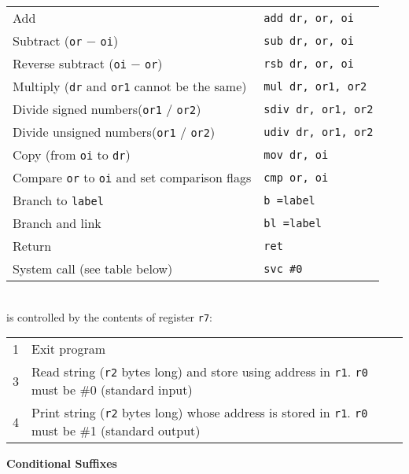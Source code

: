 \documentclass{article}
\begin{document}
\begin{tabular}{ll}
Add & {\tt add dr, or, oi} \\
Subtract ({\tt or} $-$ {\tt oi}) & {\tt sub dr, or, oi} \\
Reverse subtract ({\tt oi} $-$ {\tt or}) & {\tt rsb dr, or, oi} \\
Multiply ({\tt dr} and {\tt or1} cannot be the same) & {\tt mul dr, or1, or2} \\
Divide signed numbers\footnotemark ({\tt or1} $/$ {\tt or2}) & {\tt sdiv dr, or1, or2} \\
Divide unsigned numbers\footnotemark[1] ({\tt or1} $/$ {\tt or2}) & {\tt udiv dr, or1, or2} \\
Copy (from {\tt oi} to {\tt dr}) & {\tt mov dr, oi} \\
Compare {\tt or} to {\tt oi} and set comparison flags \hspace{2em} & {\tt cmp or, oi} \\
Branch to {\tt label} & {\tt b =label} \\
Branch and link & {\tt bl =label} \\
Return & {\tt ret} \\
System call (see table below) & {\tt svc \#0} \\
\end{tabular} \\
\hspace*{6em}{\tt svc \#0} is controlled by the contents of register {\tt r7}: \\
\hspace*{6em}\begin{tabular}{ll}
1 & Exit program \\
3 & Read string ({\tt r2} bytes long) and store using address in {\tt r1}.
  {\tt r0} must be \#0 (standard input) \\
4 & Print string ({\tt r2} bytes long) whose address is stored in {\tt r1}.
  {\tt r0} must be \#1 (standard output) \\
\end{tabular}

\vspace{1em}
\noindent
\textbf{Conditional Suffixes}
\end{document}
